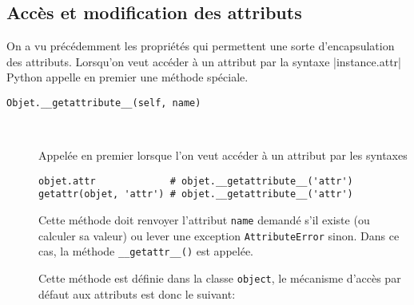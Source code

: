 \subsection{Accès et modification des attributs}
On a vu précédemment les propriétés qui permettent une sorte d'encapsulation des attributs. Lorsqu'on veut accéder à un attribut par la syntaxe |instance.attr| Python appelle en premier une méthode spéciale.

\begin{description}
    \item[\texttt{Objet.__getattribute__(self, name)}]~
    
    Appelée en premier lorsque l'on veut accéder à un attribut par les syntaxes
    \begin{verbatim}
objet.attr             # objet.__getattribute__('attr')
getattr(objet, 'attr') # objet.__getattribute__('attr')
    \end{verbatim} 
    Cette méthode doit renvoyer l'attribut \texttt{name} demandé s'il existe (ou calculer sa valeur) ou lever une exception \texttt{AttributeError} sinon. Dans ce cas, la méthode \texttt{__getattr__()} est appelée.\medskip
    
    Cette méthode est définie dans la classe \texttt{object}, le mécanisme d'accès par défaut aux attributs est
    donc le suivant:


\end{description}
